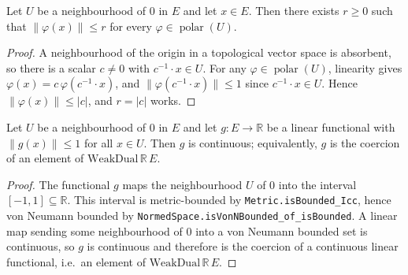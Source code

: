 \begin{lemma}
    \label{lem:polar-pointwise-bounded}
    Let $U$ be a neighbourhood of $0$ in $E$ and let $x \in E$. Then there
    exists $r \ge 0$ such that $\lVert \varphi(x) \rVert \le r$ for every
    $\varphi \in \operatorname{polar}(U)$.
\end{lemma}
\begin{proof}
    A neighbourhood of the origin in a topological vector space is absorbent, so
    there is a scalar $c \ne 0$ with $c^{-1} \cdot x \in U$. For any
    $\varphi \in \operatorname{polar}(U)$, linearity gives
    $\varphi(x) = c \, \varphi(c^{-1} \cdot x)$, and
    $\lVert \varphi(c^{-1} \cdot x) \rVert \le 1$ since $c^{-1} \cdot x \in U$.
    Hence $\lVert \varphi(x) \rVert \le \lvert c \rvert$, and $r = \lvert c
    \rvert$ works.
\end{proof}

\begin{lemma}
    \label{lem:linear-bounded-continuous}
    Let $U$ be a neighbourhood of $0$ in $E$ and let $g : E \to \mathbb{R}$ be a
    linear functional with $\lVert g(x) \rVert \le 1$ for all $x \in U$. Then
    $g$ is continuous; equivalently, $g$ is the coercion of an element of
    $\mathrm{WeakDual}\,\mathbb{R}\,E$.
\end{lemma}
\begin{proof}
    The functional $g$ maps the neighbourhood $U$ of $0$ into the interval
    $[-1,1] \subseteq \mathbb{R}$. This interval is metric-bounded by
    \texttt{Metric.isBounded\_Icc}, hence von Neumann bounded by
    \texttt{NormedSpace.isVonNBounded\_of\_isBounded}. A linear map sending some
    neighbourhood of $0$ into a von Neumann bounded set is continuous, so $g$ is
    continuous and therefore is the coercion of a continuous linear functional,
    i.e.\ an element of $\mathrm{WeakDual}\,\mathbb{R}\,E$.
\end{proof}

